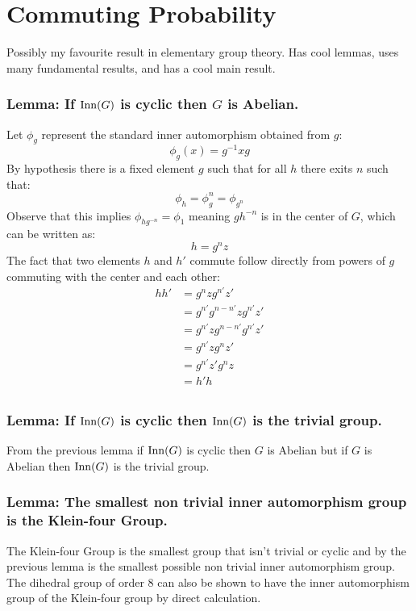
\section{Commuting Probability}
Possibly my favourite result in elementary group theory.
Has cool lemmas,
uses many fundamental results,
and has a cool main result.

\subsubsection{Lemma: If $\operatorname{Inn}(G)$ is cyclic then $G$ is Abelian.}
Let $\phi_g$ represent the standard inner automorphism obtained from $g$:
\[\phi_g(x) =g^{-1}xg\]
By hypothesis there is a fixed element $g$ such that for all $h$ there exits $n$ such that:
\[\phi_h = \phi_g^n = \phi_{g^n}\]
Observe that this implies $\phi_{hg^{-n}}=\phi_1$ meaning $gh^{-n}$ is in the center of $G$,
which can be written as:
\[h=g^nz\]
The fact that two elements $h$ and $h'$ commute follow directly from powers of $g$ commuting with the center and each other:
\[\begin{aligned}
	hh'&=g^nzg^{n'}z'\\
	&=g^{n'}g^{n-n'}zg^{n'}z'\\
	&=g^{n'}zg^{n-n'}g^{n'}z'\\
	&=g^{n'}zg^{n}z'\\
	&=g^{n'}z'g^{n}z\\
	&=h'h\\
\end{aligned}\]

\subsubsection{Lemma: If $\operatorname{Inn}(G)$ is cyclic then $\operatorname{Inn}(G)$ is the trivial group.}
From the previous lemma if $\operatorname{Inn}(G)$ is cyclic then $G$ is Abelian but if $G$ is Abelian then $\operatorname{Inn}(G)$ is the trivial group.

\subsubsection{Lemma: The smallest non trivial inner automorphism group is the Klein-four Group.}
The Klein-four Group is the smallest group that isn't trivial or cyclic and by the previous lemma is the smallest possible non trivial inner automorphism group.
The dihedral group of order $8$ can also be shown to have the inner automorphism group of the Klein-four group by direct calculation.


